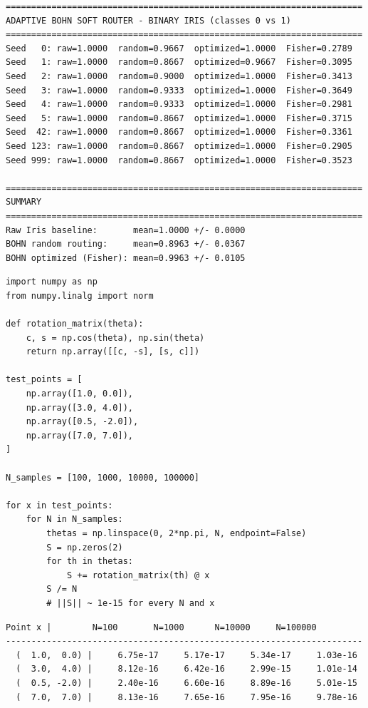 \documentclass[11pt,a4paper]{report}
\begin{document}
\label{app:ch4-lst2}
\begin{lstlisting}[caption=Results of Adaptive BOHN Soft Router on binary Iris]
======================================================================
ADAPTIVE BOHN SOFT ROUTER - BINARY IRIS (classes 0 vs 1)
======================================================================
Seed   0: raw=1.0000  random=0.9667  optimized=1.0000  Fisher=0.2789
Seed   1: raw=1.0000  random=0.8667  optimized=0.9667  Fisher=0.3095
Seed   2: raw=1.0000  random=0.9000  optimized=1.0000  Fisher=0.3413
Seed   3: raw=1.0000  random=0.9333  optimized=1.0000  Fisher=0.3649
Seed   4: raw=1.0000  random=0.9333  optimized=1.0000  Fisher=0.2981
Seed   5: raw=1.0000  random=0.8667  optimized=1.0000  Fisher=0.3715
Seed  42: raw=1.0000  random=0.8667  optimized=1.0000  Fisher=0.3361
Seed 123: raw=1.0000  random=0.8667  optimized=1.0000  Fisher=0.2905
Seed 999: raw=1.0000  random=0.8667  optimized=1.0000  Fisher=0.3523

======================================================================
SUMMARY
======================================================================
Raw Iris baseline:       mean=1.0000 +/- 0.0000
BOHN random routing:     mean=0.8963 +/- 0.0367
BOHN optimized (Fisher): mean=0.9963 +/- 0.0105
\end{lstlisting}

\label{app:ch4-lst3}
\begin{lstlisting}[style=python, caption={SO(2) symmetrizer --- numerical verification of vanishing}]
import numpy as np
from numpy.linalg import norm

def rotation_matrix(theta):
    c, s = np.cos(theta), np.sin(theta)
    return np.array([[c, -s], [s, c]])

test_points = [
    np.array([1.0, 0.0]),
    np.array([3.0, 4.0]),
    np.array([0.5, -2.0]),
    np.array([7.0, 7.0]),
]

N_samples = [100, 1000, 10000, 100000]

for x in test_points:
    for N in N_samples:
        thetas = np.linspace(0, 2*np.pi, N, endpoint=False)
        S = np.zeros(2)
        for th in thetas:
            S += rotation_matrix(th) @ x
        S /= N
        # ||S|| ~ 1e-15 for every N and x
\end{lstlisting}

\label{app:ch4-lst4}
\begin{lstlisting}[style=textstyle, caption={Result: $\|S_{\mathrm{SO}(2)}(x)\|$ for various $x$ and~$N$}]
        Point x |        N=100       N=1000      N=10000     N=100000
----------------------------------------------------------------------
  (  1.0,  0.0) |     6.75e-17     5.17e-17     5.34e-17     1.03e-16
  (  3.0,  4.0) |     8.12e-16     6.42e-16     2.99e-15     1.01e-14
  (  0.5, -2.0) |     2.40e-16     6.60e-16     8.89e-16     5.01e-15
  (  7.0,  7.0) |     8.13e-16     7.65e-16     7.95e-16     9.78e-16
\end{lstlisting}
\end{document}
